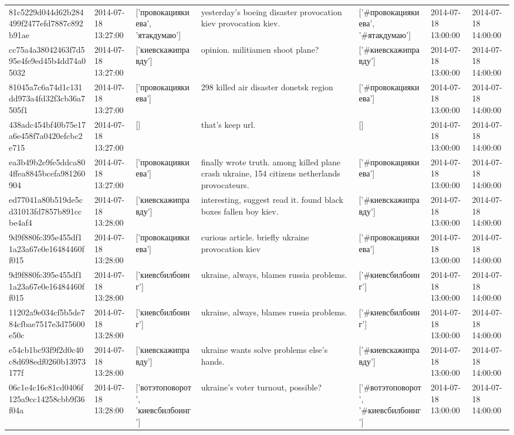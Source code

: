 \begin{tabular}{lllllll}
81c5229d044d62b284499f2477efd7887c892b91ae & 2014-07-18 13:27:00 & ['провокациякиева', 'ятакдумаю'] & yesterday's boeing disaster provocation kiev provocation kiev. & ['#провокациякиева', '#ятакдумаю'] & 2014-07-18 13:00:00 & 2014-07-18 14:00:00 \\
cc75a4a38042463f7d595e4fe9ed45b4dd74a05032 & 2014-07-18 13:27:00 & ['киевскажиправду'] & opinion. militiamen shoot plane? & ['#киевскажиправду'] & 2014-07-18 13:00:00 & 2014-07-18 14:00:00 \\
81045a7c6a74d1c131dd973a4fd32f3cb36a7505f1 & 2014-07-18 13:27:00 & ['провокациякиева'] & 298 killed air disaster donetsk region & ['#провокациякиева'] & 2014-07-18 13:00:00 & 2014-07-18 14:00:00 \\
438adc454bf40b75e17a6e458f7a0420efcbc2e715 & 2014-07-18 13:27:00 & [] & that's keep url. & [] & 2014-07-18 13:00:00 & 2014-07-18 14:00:00 \\
ea3b49b2e9fe5ddca804ffea8845bcefa981260904 & 2014-07-18 13:27:00 & ['провокациякиева'] & finally wrote truth. among killed plane crash ukraine, 154 citizens netherlands provocateurs. & ['#провокациякиева'] & 2014-07-18 13:00:00 & 2014-07-18 14:00:00 \\
ed77041a80b519de5cd31013fd7857b891ccbe4af4 & 2014-07-18 13:28:00 & ['киевскажиправду'] & interesting, suggest read it. found black boxes fallen boy kiev. & ['#киевскажиправду'] & 2014-07-18 13:00:00 & 2014-07-18 14:00:00 \\
9d9f880fc395e455df11a23a67e0e16484460ff015 & 2014-07-18 13:28:00 & ['провокациякиева'] & curious article. briefly ukraine provocation kiev & ['#провокациякиева'] & 2014-07-18 13:00:00 & 2014-07-18 14:00:00 \\
9d9f880fc395e455df11a23a67e0e16484460ff015 & 2014-07-18 13:28:00 & ['киевсбилбоинг'] & ukraine, always, blames russia problems. & ['#киевсбилбоинг'] & 2014-07-18 13:00:00 & 2014-07-18 14:00:00 \\
11202a9e034cf5b5de784cfbae7517e3d75600e50c & 2014-07-18 13:28:00 & ['киевсбилбоинг'] & ukraine, always, blames russia problems. & ['#киевсбилбоинг'] & 2014-07-18 13:00:00 & 2014-07-18 14:00:00 \\
e54cb1bc93f9f2d0c40c8d698edf0260b13973177f & 2014-07-18 13:28:00 & ['киевскажиправду'] & ukraine wants solve problems else's hands. & ['#киевскажиправду'] & 2014-07-18 13:00:00 & 2014-07-18 14:00:00 \\
06c1e4c16c81cd0406f125a9cc14258cbb9f36f04a & 2014-07-18 13:28:00 & ['вотэтоповорот', 'киевсбилбоинг'] & ukraine's voter turnout, possible? & ['#вотэтоповорот', '#киевсбилбоинг'] & 2014-07-18 13:00:00 & 2014-07-18 14:00:00 \\

\end{tabular}
